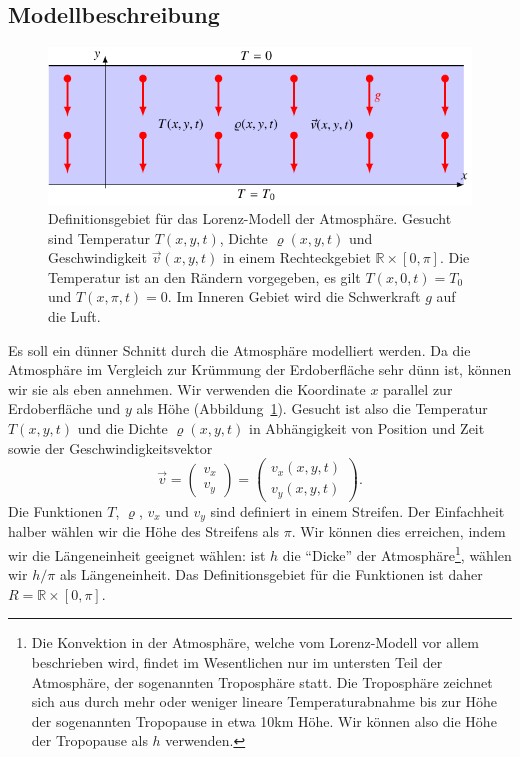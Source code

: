 \subsection{Modellbeschreibung}
\begin{figure}
\centering
\includegraphics{chapters/2/lorenz-definition.pdf}
\caption{Definitionsgebiet für das Lorenz-Modell der Atmosphäre.
Gesucht sind Temperatur $T(x,y,t)$, Dichte $\varrho(x,y,t)$ und
Geschwindigkeit $\vec{v}(x,y,t)$ in einem Rechteckgebiet
$\mathbb R\times [0,\pi]$.
Die Temperatur ist an den Rändern vorgegeben, es gilt
$T(x,0,t)=T_0$ und $T(x,\pi,t)=0$.
Im Inneren Gebiet wird die Schwerkraft $g$ auf die Luft.
\label{skript:lorenzmodell definitionsgebiet}}
\end{figure}
Es soll ein dünner Schnitt durch die Atmosphäre modelliert werden.
Da die Atmosphäre im Vergleich zur Krümmung der Erdoberfläche sehr dünn ist,
können wir sie als eben annehmen.
Wir verwenden die Koordinate $x$ parallel zur Erdoberfläche und $y$ als Höhe
(Abbildung~\ref{skript:lorenzmodell definitionsgebiet}).
Gesucht ist also die Temperatur $T(x,y,t)$ und die Dichte $\varrho(x,y,t)$
in Abhängigkeit von Position und Zeit sowie der Geschwindigkeitsvektor
\[
\vec v
=
\begin{pmatrix}v_x\\v_y\end{pmatrix}
=
\begin{pmatrix}v_x(x,y,t)\\v_y(x,y,t)\end{pmatrix}.
\]
Die Funktionen $T$, $\varrho$, $v_x$ und $v_y$ sind definiert in einem
Streifen.
Der Einfachheit halber wählen wir die Höhe des Streifens als $\pi$.
Wir können dies erreichen, indem wir die Längeneinheit geeignet wählen:
ist $h$ die ``Dicke'' der Atmosphäre\footnote{Die Konvektion in der Atmosphäre,
welche vom Lorenz-Modell vor allem beschrieben wird, findet im Wesentlichen
nur im untersten Teil der Atmosphäre, der sogenannten Troposphäre statt.
Die Troposphäre zeichnet sich aus durch mehr oder weniger lineare
Temperaturabnahme bis zur Höhe der sogenannten Tropopause in etwa
10km Höhe.
Wir können also die Höhe der Tropopause als $h$ verwenden.}, wählen wir
$h/\pi$ als Längeneinheit.
Das Definitionsgebiet für die Funktionen ist daher $R=\mathbb R\times [0,\pi]$.

